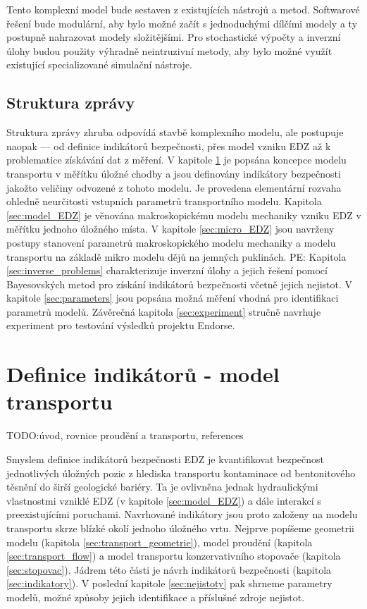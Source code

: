\documentclass{article}
\def\todo#1{{TODO:\color{violet}#1}}
\newcommand{\pe}[1]{{\color{orange} PE: #1}}
\begin{document}
Tento komplexní model bude sestaven z existujících nástrojů a metod. Softwarové řešení bude modulární, aby bylo možné začít s
jednoduchými dílčími modely a ty postupně nahrazovat modely složitějšími. Pro stochastické výpočty a inverzní úlohy budou 
použity výhradně neintruzivní metody, aby bylo možné využít existující specializované simulační nástroje.

    
\subsection{Struktura zprávy}
Struktura zprávy zhruba odpovídá stavbě komplexního modelu, ale postupuje naopak --- od definice indikátorů bezpečnosti,
přes model vzniku EDZ až k problematice získávání dat z měření. 
V kapitole \ref{sec:transport} je popsána koncepce modelu transportu v měřítku úložné chodby a 
jsou definovány indikátory bezpečnosti jakožto veličiny odvozené z tohoto modelu. Je provedena elementární rozvaha ohledně 
neurčitosti vstupních parametrů transportního modelu. Kapitola
\ref{sec:model_EDZ} je věnována makroskopickému modelu mechaniky vzniku EDZ v měřítku jednoho úložného místa. 
V kapitole \ref{sec:micro_EDZ} jsou navrženy postupy stanovení parametrů makroskopického modelu mechaniky a modelu transportu 
na základě mikro modelu dějů na jemných puklinách.
\pe{Kapitola \ref{sec:inverse_problems} charakterizuje inverzní úlohy a jejich řešení pomocí Bayesovských metod 
pro získání indikátorů bezpečnosti včetně jejich nejistot.}
V kapitole \ref{sec:parameters} jsou popsána možná měření vhodná pro identifikaci 
parametrů modelů. Závěrečná kapitola \ref{sec:experiment} stručně navrhuje experiment pro testování výsledků projektu Endorse.


\section{Definice indikátorů - model transportu}
\label{sec:transport}
\todo{úvod, rovnice proudění a transportu, references}

Smyslem definice indikátorů bezpečnosti EDZ je kvantifikovat bezpečnost jednotlivých úložných pozic z hlediska 
transportu kontaminace od bentonitového těsnění do širší geologické bariéry. Ta je ovlivněna jednak hydraulickými vlastnostmi
vzniklé EDZ (v kapitole \ref{sec:model_EDZ}) a dále interakcí s preexistujícími poruchami. 
Navrhované indikátory jsou proto založeny na modelu transportu skrze blízké okolí jednoho úložného vrtu. 
Nejprve popíšeme geometrii modelu (kapitola  \ref{sec:transport_geometrie}), model proudění (kapitola \ref{sec:transport_flow})
a model transportu konzervativního stopovače (kapitola \ref{sec:stopovac}). Jádrem této části je návrh indikátorů bezpečnosti (kapitola \ref{sec:indikatory}). 
V poslední kapitole \ref{sec:nejistoty} pak shrneme parametry modelů, možné způsoby jejich identifikace a příslušné zdroje nejistot.
\end{document}
